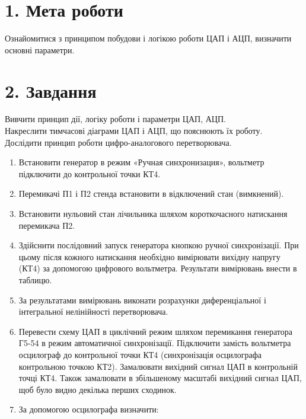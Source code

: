 \documentclass[14pt]{extreport}
\begin{document}
\section*{\textrm{1. Мета роботи}}

Ознайомитися з принципом побудови і логікою роботи
ЦАП і АЦП, визначити основні параметри.

\section*{\textrm{2. Завдання}}



 Вивчити принцип дії, логіку роботи і параметри ЦАП, АЦП.\\

 Накреслити тимчасові діаграми ЦАП і АЦП, що пояснюють їх роботу.\\

 Дослідити принцип роботи цифро-аналогового перетворювача.\\

\begin{enumerate}
\item Встановити генератор в режим «Ручная синхронизация», вольтметр підключити до контрольної точки КТ4.
\item Перемикачі П1 і П2 стенда встановити в відключений стан (вимкнений).
\item Встановити нульовий стан лічильника шляхом короткочасного натискання перемикача П2.
\item Здійснити послідовний запуск генератора кнопкою ручної синхронізації.
При цьому після кожного натискання необхідно вимірювати вихідну напругу
(КТ4) за допомогою цифрового вольтметра. Результати вимірювань внести в
таблицю.
\item За результатами вимірювань виконати розрахунки диференціальної і
інтегральної нелінійності перетворювача.
\item Перевести схему ЦАП в циклічний режим шляхом перемикання
генератора Г5-54 в режим автоматичної синхронізації. Підключити замість
вольтметра осцилограф до контрольної точки КТ4 (синхронізація осцилографа
контрольною точкою КТ2). Замалювати вихідний сигнал ЦАП в контрольній
точці КТ4. Також замалювати в збільшеному масштабі вихідний сигнал ЦАП,
щоб було видно декілька перших сходинок.

\item За допомогою осцилографа визначити:

\end{enumerate}
\end{document}
